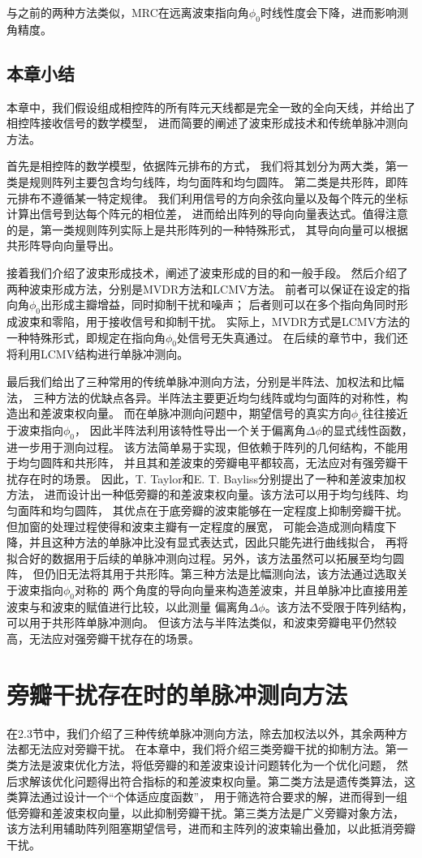 \documentclass[master]{thesis-uestc}
\begin{document}
与之前的两种方法类似，MRC在远离波束指向角$\phi_0$时线性度会下降，进而影响测角精度。

\section{本章小结}
本章中，我们假设组成相控阵的所有阵元天线都是完全一致的全向天线，并给出了相控阵接收信号的数学模型，
进而简要的阐述了波束形成技术和传统单脉冲测向方法。

首先是相控阵的数学模型，依据阵元排布的方式，
我们将其划分为两大类，第一类是规则阵列主要包含均匀线阵，均匀面阵和均匀圆阵。
第二类是共形阵，即阵元排布不遵循某一特定规律。
我们利用信号的方向余弦向量以及每个阵元的坐标计算出信号到达每个阵元的相位差，
进而给出阵列的导向向量表达式。值得注意的是，第一类规则阵列实际上是共形阵列的一种特殊形式，
其导向向量可以根据共形阵导向向量导出。

接着我们介绍了波束形成技术，阐述了波束形成的目的和一般手段。
然后介绍了两种波束形成方法，分别是MVDR方法和LCMV方法。
前者可以保证在设定的指向角$\phi_0$出形成主瓣增益，同时抑制干扰和噪声；
后者则可以在多个指向角同时形成波束和零陷，用于接收信号和抑制干扰。
实际上，MVDR方式是LCMV方法的一种特殊形式，即规定在指向角$\phi_0$处信号无失真通过。
在后续的章节中，我们还将利用LCMV结构进行单脉冲测向。

最后我们给出了三种常用的传统单脉冲测向方法，分别是半阵法、加权法和比幅法，
三种方法的优缺点各异。半阵法主要更近均匀线阵或均匀面阵的对称性，构造出和差波束权向量。
而在单脉冲测向问题中，期望信号的真实方向$\phi_s$往往接近于波束指向$\phi_0$，
因此半阵法利用该特性导出一个关于偏离角$\Delta\phi$的显式线性函数，进一步用于测向过程。
该方法简单易于实现，但依赖于阵列的几何结构，不能用于均匀圆阵和共形阵，
并且其和差波束的旁瓣电平都较高，无法应对有强旁瓣干扰存在时的场景。
因此，T. Taylor和E. T. Bayliss分别提出了一种和差波束加权方法，
进而设计出一种低旁瓣的和差波束权向量。该方法可以用于均匀线阵、均匀面阵和均匀圆阵，
其优点在于底旁瓣的波束能够在一定程度上抑制旁瓣干扰。但加窗的处理过程使得和波束主瓣有一定程度的展宽，
可能会造成测向精度下降，并且这种方法的单脉冲比没有显式表达式，因此只能先进行曲线拟合，
再将拟合好的数据用于后续的单脉冲测向过程。另外，该方法虽然可以拓展至均匀圆阵，
但仍旧无法将其用于共形阵。第三种方法是比幅测向法，该方法通过选取关于波束指向$\phi_0$对称的
两个角度的导向向量来构造差波束，并且单脉冲比直接用差波束与和波束的赋值进行比较，以此测量
偏离角$\Delta\phi$。该方法不受限于阵列结构，可以用于共形阵单脉冲测向。
但该方法与半阵法类似，和波束旁瓣电平仍然较高，无法应对强旁瓣干扰存在的场景。

\chapter{旁瓣干扰存在时的单脉冲测向方法}
在2.3节中，我们介绍了三种传统单脉冲测向方法，除去加权法以外，其余两种方法都无法应对旁瓣干扰。
在本章中，我们将介绍三类旁瓣干扰的抑制方法。第一类方法是波束优化方法，将低旁瓣的和差波束设计问题转化为一个优化问题，
然后求解该优化问题得出符合指标的和差波束权向量。第二类方法是遗传类算法，这类算法通过设计一个“个体适应度函数”，
用于筛选符合要求的解，进而得到一组低旁瓣和差波束权向量，以此抑制旁瓣干扰。第三类方法是广义旁瓣对象方法，
该方法利用辅助阵列阻塞期望信号，进而和主阵列的波束输出叠加，以此抵消旁瓣干扰。
\end{document}
